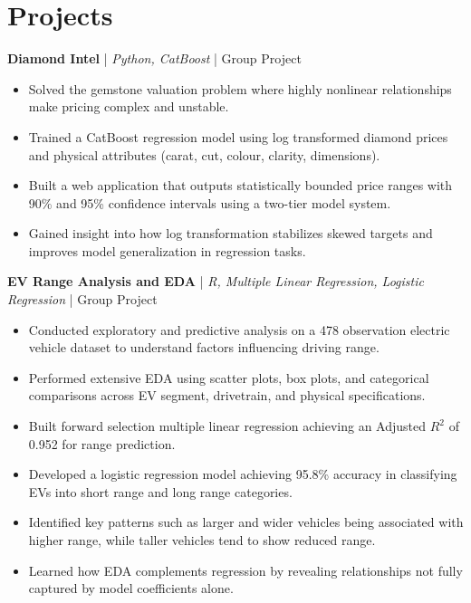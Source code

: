 \documentclass[10pt, a4paper]{article}
\newcommand{\cvproject}[2]{%
  \vspace{5pt}%
  \textbf{#1} \textcolor{midgray}{| \textit{#2} | Group Project}%
  \vspace{1pt}%
}
\newenvironment{cvlist}{%
  \begin{itemize}[leftmargin=1.3em, itemsep=1pt, topsep=2pt, parsep=0pt]
}{%
  \end{itemize}%
}
\begin{document}
\section{Projects}

\cvproject{Diamond Intel}{Python, CatBoost}
\begin{cvlist}
  \item Solved the gemstone valuation problem where highly nonlinear relationships make pricing complex and unstable.
  \item Trained a CatBoost regression model using log transformed diamond prices and physical attributes (carat, cut, colour, clarity, dimensions).
  \item Built a web application that outputs statistically bounded price ranges with 90\% and 95\% confidence intervals using a two-tier model system.
  \item Gained insight into how log transformation stabilizes skewed targets and improves model generalization in regression tasks.
\end{cvlist}

\begin{samepage}
\cvproject{EV Range Analysis and EDA}{R, Multiple Linear Regression, Logistic Regression}
\begin{cvlist}
  \item Conducted exploratory and predictive analysis on a 478 observation electric vehicle dataset to understand factors influencing driving range.
  \item Performed extensive EDA using scatter plots, box plots, and categorical comparisons across EV segment, drivetrain, and physical specifications.
  \item Built forward selection multiple linear regression achieving an Adjusted $R^2$ of 0.952 for range prediction.
  \item Developed a logistic regression model achieving 95.8\% accuracy in classifying EVs into short range and long range categories.
  \item Identified key patterns such as larger and wider vehicles being associated with higher range, while taller vehicles tend to show reduced range.
  \item Learned how EDA complements regression by revealing relationships not fully captured by model coefficients alone.
\end{cvlist}
\end{samepage}
\end{document}

